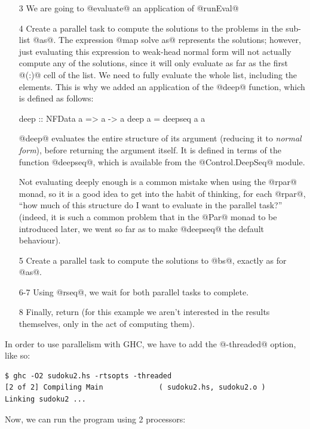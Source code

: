 \begin{itemize}
\item[3] We are going to @evaluate@ an application of @runEval@
\item[4] Create a parallel task to compute the solutions to the
  problems in the sub-list @as@.  The expression @map solve as@
  represents the solutions; however, just evaluating this expression
  to weak-head normal form will not actually compute any of the
  solutions, since it will only evaluate as far as the first @(:)@
  cell of the list.  We need to fully evaluate the whole list,
  including the elements.  This is why we added an application of the
  @deep@ function, which is defined as follows:

\begin{haskell}
deep :: NFData a => a -> a
deep a = deepseq a a
\end{haskell}
\noindent @deep@ evaluates the entire structure of its argument
(reducing it to \emph{normal form}), before returning the argument
itself.  It is defined in terms of the function @deepseq@, which is
available from the @Control.DeepSeq@ module.

  Not evaluating deeply enough is a common mistake when using the
  @rpar@ monad, so it is a good idea to get into the habit of
  thinking, for each @rpar@, ``how much of this structure do I want to
  evaluate in the parallel task?'' (indeed, it is such a common
  problem that in the @Par@ monad to be introduced later, we went so
  far as to make @deepseq@ the default behaviour).

\item[5] Create a parallel task to compute the solutions to @bs@,
  exactly as for @as@.
\item[6-7] Using @rseq@, we wait for both parallel tasks to complete.
\item[8] Finally, return (for this example we aren't interested in the
  results themselves, only in the act of computing them).
\end{itemize}

In order to use parallelism with GHC, we have to add the @-threaded@
option, like so:

{\small \begin{verbatim}
$ ghc -O2 sudoku2.hs -rtsopts -threaded
[2 of 2] Compiling Main             ( sudoku2.hs, sudoku2.o )
Linking sudoku2 ...
\end{verbatim}}

\noindent Now, we can run the program using 2 processors:

